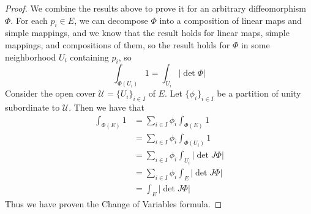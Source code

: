 \documentclass{article}
\theoremstyle{plain} %
\numberwithin{thm}{section} %
\theoremstyle{definition}
\begin{document}
\begin{proof}
        We combine the results above to prove it for an arbitrary diffeomorphism \(\Phi\). For each \(p_i \in E\), we can decompose \(\Phi\) into a composition of linear maps and simple mappings, and we know that the result holds for linear maps, simple mappings, and compositions of them, so the result holds for \(\Phi\) in some neighborhood \(U_i\) containing \(p_i\), so
        \[
            \int _{\Phi (U_i)} 1 = \int _{U_i} |\det \Phi |
        \]
        Consider the open cover \(\mathcal{U} = \{ U_i \} _{i \in I}\) of \(E\). Let \(\{ \phi_i \} _{i \in I}\) be a partition of unity subordinate to \(\mathcal{U}\). Then we have that
        \begin{align*}
            \int _{\Phi (E)}1 &= \sum_{i \in I} \phi _i \int _{\Phi (E)} 1 \\
            &= \sum_{i \in I} \phi _i \int _{\Phi (U_i)} 1 \\
            &= \sum_{i \in I} \phi _i \int _{U_i} |\det J \Phi |\\
            &= \sum_{i \in I} \phi _i \int _{E} |\det J \Phi | \\
            &= \int _E |\det J \Phi |
        \end{align*}
        Thus we have proven the Change of Variables formula.
    \end{proof}
\end{document}
